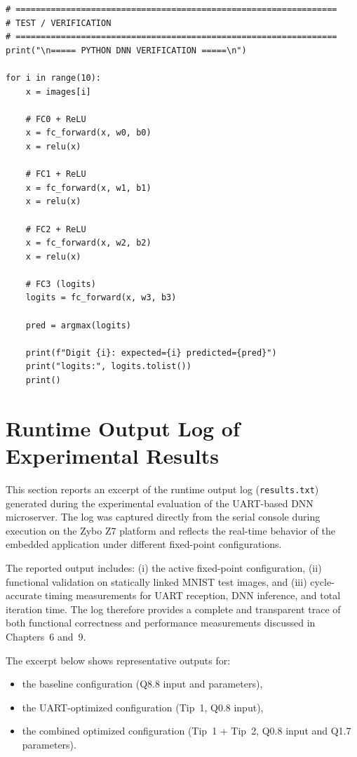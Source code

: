 \begin{lstlisting}
# ================================================================
# TEST / VERIFICATION
# ================================================================
print("\n===== PYTHON DNN VERIFICATION =====\n")

for i in range(10):
    x = images[i]

    # FC0 + ReLU
    x = fc_forward(x, w0, b0)
    x = relu(x)

    # FC1 + ReLU
    x = fc_forward(x, w1, b1)
    x = relu(x)

    # FC2 + ReLU
    x = fc_forward(x, w2, b2)
    x = relu(x)

    # FC3 (logits)
    logits = fc_forward(x, w3, b3)

    pred = argmax(logits)

    print(f"Digit {i}: expected={i} predicted={pred}")
    print("logits:", logits.tolist())
    print()

\end{lstlisting}

\section{Runtime Output Log of Experimental Results}
\label{sec:appendix_results_log}

This section reports an excerpt of the runtime output log (\texttt{results.txt})
generated during the experimental evaluation of the UART-based DNN microserver.
The log was captured directly from the serial console during execution on the
Zybo Z7 platform and reflects the real-time behavior of the embedded application
under different fixed-point configurations.

The reported output includes:
(i) the active fixed-point configuration,
(ii) functional validation on statically linked MNIST test images,
and (iii) cycle-accurate timing measurements for UART reception, DNN inference,
and total iteration time.
The log therefore provides a complete and transparent trace of both functional
correctness and performance measurements discussed in Chapters~6 and~9.

The excerpt below shows representative outputs for:
\begin{itemize}
    \item the baseline configuration (Q8.8 input and parameters),
    \item the UART-optimized configuration (Tip~1, Q0.8 input),
    \item the combined optimized configuration (Tip~1 + Tip~2, Q0.8 input and Q1.7 parameters).
\end{itemize}

